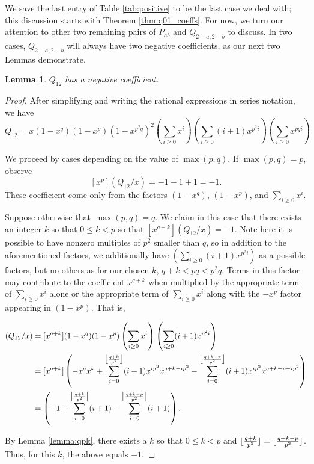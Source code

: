 \documentclass[11pt]{amsart}
\numberwithin{equation}{section}
\theoremstyle{plain}
\newtheorem{lemma}[equation]{Lemma}
\theoremstyle{definition}
\begin{document}

We save the last entry of Table \ref{tab:positive} to be the last case we deal with; this discussion starts with Theorem \ref{thm:q01_coeffs}. For now, we turn our attention to other two remaining pairs of $P_{ab}$ and $Q_{2-a,2-b}$ to discuss. In two cases, $Q_{2-a,2-b}$ will always have two negative coefficients, as our next two Lemmas demonstrate.

\begin{lemma}
$Q_{12}$ has a negative coefficient. 
\end{lemma}
\begin{proof} %
After simplifying and writing the rational expressions in series notation, we have
\[Q_{12}=x(1-x^q)(1-x^p)(1-x^{p^2q})^2 \left(\sum_{i\geq 0}x^{i}\right)\left(\sum_{i\geq 0}(i+1)x^{p^2i}\right)\left(\sum_{i\geq 0}x^{pqi}\right)\]

We proceed by cases depending on the value of $\max(p,q)$. 
If $\max(p,q)=p$, observe 
\[[x^p](Q_{12}/x)=-1-1+1=-1.\]
These coefficient come only from the factors $(1-x^q)$, $(1-x^p)$, and $\displaystyle \sum_{i\geq 0}x^{i}$.

Suppose otherwise that $\max(p,q)=q$. We claim in this case that there exists an integer $k$ so that $0\leq k<p$ so that $[x^{q+k}](Q_{12}/x)=-1$. Note here it is possible to have nonzero multiples of $p^2$ smaller than $q$, so in addition to the aforementioned factors, we additionally have $\displaystyle \left(\sum_{i\geq 0}(i+1)x^{p^2i}\right)$ as a possible factors, but no others as for our chosen $k$, $q+k<pq<p^2q$. Terms in this factor may contribute to the coefficient $x^{q+k}$ when multiplied by the appropriate term of $\displaystyle \sum_{i\geq 0}x^{i}$ alone or the appropriate term of $\displaystyle \sum_{i\geq 0}x^{i}$ along with the $-x^p$ factor appearing in $(1-x^p)$. That is, 

\begin{align*}
[x^{q+k}](Q_{12}/x)&=[x^{q+k}](1-x^q)(1-x^p)\left(\sum_{i\geq 0}x^{i}\right)\left(\sum_{i\geq 0}(i+1)x^{p^2i}\right)\\
&=[x^{q+k}]\left(-x^qx^k+\sum_{i=0}^{\left\lfloor {q+k\over p^2}\right\rfloor}(i+1)x^{ip^2}x^{q+k-ip^2}- \sum_{i=0}^{\left\lfloor {q+k-p\over p^2}\right\rfloor}(i+1)x^{ip^2}x^{q+k-p-ip^2}     \right)\\
&=\left(-1+\sum_{i=0}^{\left\lfloor {q+k\over p^2}\right\rfloor}(i+1)- \sum_{i=0}^{\left\lfloor {q+k-p\over p^2}\right\rfloor}(i+1)    \right).
\end{align*}

By Lemma \ref{lemma:qpk}, there exists a $k$ so that $0\leq k<p$ and $\lfloor {q+k\over p^2}\rfloor=\lfloor {q+k-p\over p^2}\rfloor$. Thus, for this $k$, the above equals $-1$.


\end{proof}
\end{document}
